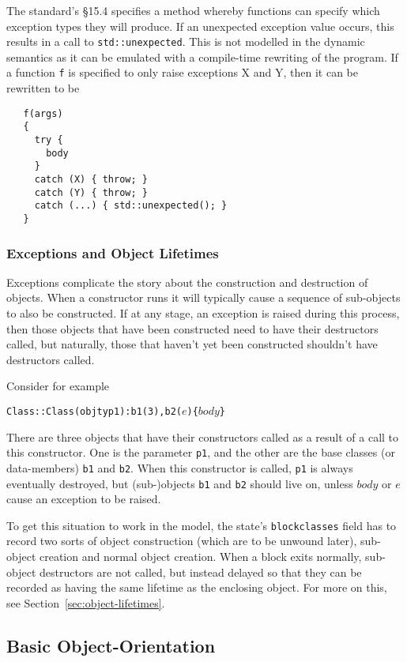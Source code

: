 \documentclass[11pt]{article}
\begin{document}
The standard's \S15.4 specifies a method whereby functions can specify
which exception types they will produce.  If an unexpected exception
value occurs, this results in a call to \texttt{std::unexpected}.
This is not modelled in the dynamic semantics as it can be emulated
with a compile-time rewriting of the program.  If a function
\texttt{f} is specified to only raise exceptions X and Y, then it can
be rewritten to be
\begin{verbatim}
   f(args)
   {
     try {
       body
     }
     catch (X) { throw; }
     catch (Y) { throw; }
     catch (...) { std::unexpected(); }
   }
\end{verbatim}

\subsubsection{Exceptions and Object Lifetimes}

Exceptions complicate the story about the construction and destruction
of objects.  When a constructor runs it will typically cause a
sequence of sub-objects to also be constructed. If at any stage, an
exception is raised during this process, then those objects that have
been constructed need to have their destructors called, but naturally,
those that haven't yet been constructed shouldn't have destructors
called.

Consider for example
\begin{alltt}
  Class::Class(objty p1) : b1(3), b2(\(e\)) \{ \(\mathit{body}\) \}
\end{alltt}
There are three objects that have their constructors called as a
result of a call to this constructor.  One is the parameter
\texttt{p1}, and the other are the base classes (or data-members)
\texttt{b1} and \texttt{b2}.  When this constructor is called,
\texttt{p1} is always eventually destroyed, but (sub-)objects
\texttt{b1} and \texttt{b2} should live on, unless $\mathit{body}$ or
$e$ cause an exception to be raised.

To get this situation to work in the model, the state's
\texttt{blockclasses} field has to record two sorts of object
construction (which are to be unwound later), sub-object creation and
normal object creation.  When a block exits normally, sub-object
destructors are not called, but instead delayed so that they can be
recorded as having the same lifetime as the enclosing object.  For
more on this, see Section~\ref{sec:object-lifetimes}.

\subsection{Basic Object-Orientation}
\label{sec:basic-oo}
\end{document}
